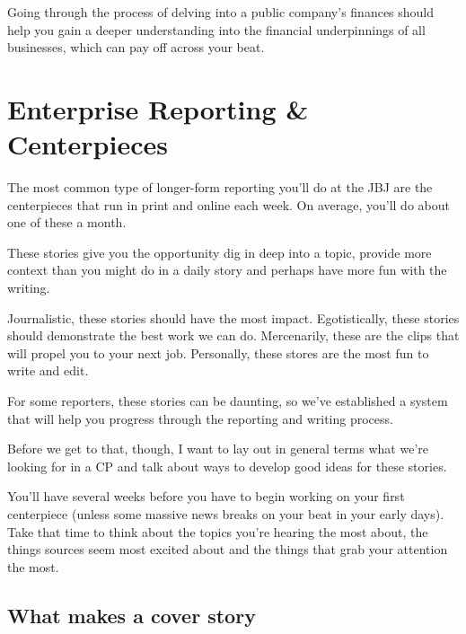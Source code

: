 \documentclass[
  11pt,
  american,
  letterpaperpaper,
  extrafontsizes,onecolumn,openright
  ]{memoir}
\begin{document}
Going through the process of delving into a public company's finances should help you gain a deeper understanding into the financial underpinnings of all businesses, which can pay off across your beat.

\hypertarget{enterprise-reporting-centerpieces}{%
\chapter{Enterprise Reporting \& Centerpieces}\label{enterprise-reporting-centerpieces}}

The most common type of longer-form reporting you'll do at the JBJ are the centerpieces that run in print and online each week. On average, you'll do about one of these a month.

These stories give you the opportunity dig in deep into a topic, provide more context than you might do in a daily story and perhaps have more fun with the writing.

Journalistic, these stories should have the most impact. Egotistically, these stories should demonstrate the best work we can do. Mercenarily, these are the clips that will propel you to your next job. Personally, these stores are the most fun to write and edit.

For some reporters, these stories can be daunting, so we've established a system that will help you progress through the reporting and writing process.

Before we get to that, though, I want to lay out in general terms what we're looking for in a CP and talk about ways to develop good ideas for these stories.

\leavevmode{}%
\begin{greybox}[frametitle=Onboarding Path]
You'll have several weeks before you have to begin working on your first centerpiece (unless some massive news breaks on your beat in your early days). Take that time to think about the topics you're hearing the most about, the things sources seem most excited about and the things that grab your attention the most.

\end{greybox}

\hypertarget{what-makes-a-cover-story}{%
\section*{What makes a cover story}\label{what-makes-a-cover-story}}
\end{document}
